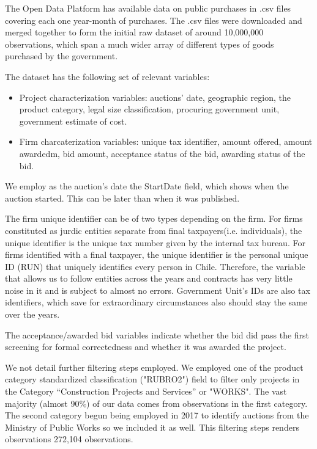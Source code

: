 The Open Data Platform has available data on public purchases in .csv files covering each one year-month of purchases. The .csv files were downloaded and merged together to form the initial raw dataset of around 10,000,000 observations, which span a much wider array of different types of goods purchased by the government.

The dataset has the following set of relevant variables:
\begin{itemize}
  \item Project characterization variables: auctions’ date, geographic region, the product category, legal size classification, procuring government unit, government estimate of cost.
  \item Firm charcaterization variables: unique tax identifier, amount offered, amount awardedm, bid amount, acceptance status of the bid, awarding status of the bid.
\end{itemize}

We employ as the auction's date the StartDate field, which shows when the auction started. This can be later than when it was published.

The firm unique identifier can be of two types depending on the firm. For firms constituted as jurdic entities separate from final taxpayers(i.e. individuals), the unique identifier is the unique tax number given by the internal tax bureau. For firms identified with a final taxpayer, the unique identifier is the personal unique ID (RUN) that uniquely identifies every person in Chile. Therefore, the variable that allows us to follow entities across the years and contracts has very little noise in it and is subject to almost no errors. Government Unit's IDs are also tax identifiers, which save for extraordinary circumstances also should stay the same over the years.

The acceptance/awarded bid variables indicate whether the bid did pass the first screening for formal correctedness and whether it was awarded the project.

We not detail further filtering steps employed. We  employed one of the product category standardized classification ("RUBRO2") field to filter only projects in the Category “Construction Projects and Services” or "WORKS". The vast majority (almost 90\%) of our data comes from observations in the first category. The second category begun being employed in 2017 to identify auctions from the Ministry of Public Works so we included it as well. This filtering steps renders observations 272,104 observations.

